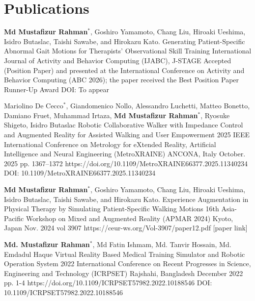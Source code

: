 \section{Publications}

\cvJournalListStart
\cvJournal
{\textbf{Md Mustafizur Rahman}$^{*}$, Goshiro Yamamoto, Chang Liu, Hiroaki Ueshima, Isidro Butaslac, Taishi Sawabe, and Hirokazu Kato.}
{Generating Patient-Specific Abnormal Gait Motions for Therapists’ Observational Skill Training}
{International Journal of Activity and Behavior Computing (IJABC), J-STAGE}
{Accepted (Position Paper) and presented at the International Conference on Activity and Behavior Computing (ABC 2026); the paper received the Best Position Paper Runner-Up Award}
{}
{}
{}
{DOI: To appear}
\cvJournalListEnd


\cvConfListStart
\cvConference
{Mariolino De Cecco$^{*}$, Giandomenico Nollo, Alessandro Luchetti, Matteo Bonetto, Damiano Fruet, Muhammad Irtaza, \textbf{Md Mustafizur Rahman}$^{*}$, Ryosuke Shigeto, Isidro Butaslac}
{Robotic Collaborative Walker with Impedance Control and Augmented Reality for Assisted Walking and User Empowerment}
{2025 IEEE International Conference on Metrology for eXtended Reality, Artificial Intelligence and Neural Engineering (MetroXRAINE)}
{ANCONA, Italy}
{October. 2025}
{pp. 1367–1372}
{https://doi.org/10.1109/MetroXRAINE66377.2025.11340234}
{DOI: 10.1109/MetroXRAINE66377.2025.11340234}

\cvConference
{\textbf{Md Mustafizur Rahman}$^{*}$, Goshiro Yamamoto, Chang Liu, Hiroaki Ueshima, Isidro Butaslac, Taishi Sawabe, and Hirokazu Kato.}
{Experience Augmentation in Physical Therapy by Simulating Patient-Specific Walking Motions}
{16th Asia-Pacific Workshop on Mixed and Augmented
Reality (APMAR 2024)}
{Kyoto, Japan}
{Nov. 2024}
{vol 3907}
{https://ceur-ws.org/Vol-3907/paper12.pdf}
{[paper link]}

\cvConference
{\textbf{Md. Mustafizur Rahman}$^{*}$, Md Fatin Ishmam, Md. Tanvir Hossain, Md. Emdadul Haque}
{Virtual Reality Based Medical Training Simulator and Robotic Operation System}
{2022 International Conference on Recent Progresses in Science, Engineering and Technology (ICRPSET)}
{Rajshahi, Bangladesh}
{December 2022}
{pp. 1-4}
{https://doi.org/10.1109/ICRPSET57982.2022.10188546}
{DOI: 10.1109/ICRPSET57982.2022.10188546}

\cvConfListEnd


